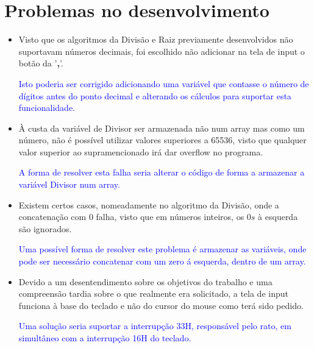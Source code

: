 \chapter{Problemas no desenvolvimento}
\begin{itemize}
	\normalsize
	\setlength\parindent{24pt}
	
	\item Visto que os algoritmos da Divisão e Raiz previamente desenvolvidos não suportavam números decimais, foi escolhido não adicionar na tela de input o botão da '\textbf{,}'.
	\begin{adjustwidth*}{0.5cm}{0cm}
			\textcolor{blue}{Isto poderia ser corrigido adicionando uma variável que contasse o número de dígitos antes do ponto decimal e alterando os cálculos para suportar esta funcionalidade.\\}
	\end{adjustwidth*}
	
	\item À custa da variável de Divisor ser armazenada não num array mas como um número, não é possível utilizar valores superiores a 65536, visto que qualquer valor superior ao supramencionado irá dar overflow no programa. 
	\begin{adjustwidth*}{0.5cm}{0cm}
		\textcolor{blue}{A forma de resolver esta falha seria alterar o código de forma a armazenar a variável Divisor num array.\\}
	\end{adjustwidth*}

	\item Existem certos casos, nomeadamente no algoritmo da Divisão, onde a concatenação com 0 falha, visto que em números inteiros, os $0s$ à esquerda são ignorados.
	\begin{adjustwidth*}{0.5cm}{0cm}
		\textcolor{blue}{Uma possível forma de resolver este problema é armazenar as variáveis, onde pode ser necessário concatenar com um zero á esquerda, dentro de um array.\\}
	\end{adjustwidth*}

	\item Devido a um desentendimento sobre os objetivos do trabalho e uma compreensão tardia sobre o que realmente era solicitado, a tela de input funciona à base do teclado e não do cursor do mouse como terá sido pedido. 
	\begin{adjustwidth*}{0.5cm}{0cm}
		\textcolor{blue}{Uma solução seria suportar a interrupção 33H, responsável pelo rato, em simultâneo com a interrupção 16H do teclado.\\}
	\end{adjustwidth*}


\end{itemize}
